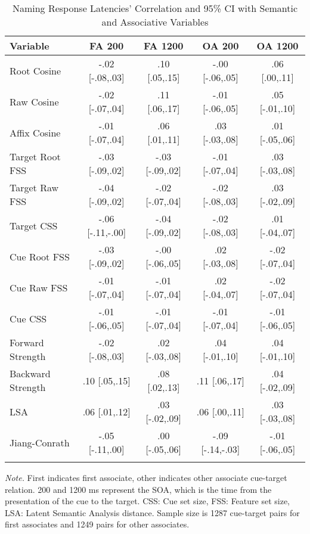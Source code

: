 \documentclass[english,,man]{apa6}
\theoremstyle{definition}
\theoremstyle{definition}
\theoremstyle{definition}
\theoremstyle{remark}
\begin{document}
\begin{table}[tbp]
\begin{center}
\begin{threeparttable}
\caption{\label{tab:name-table}Naming Response Latencies' Correlation and 95\% CI with Semantic and Associative Variables}
\small{
\begin{tabular}{lcccc}
\toprule
Variable & \multicolumn{1}{c}{FA 200} & \multicolumn{1}{c}{FA 1200} & \multicolumn{1}{c}{OA 200} & \multicolumn{1}{c}{OA 1200}\\
\midrule
Root Cosine & -.02 [-.08,.03] & .10 [.05,.15] & -.00 [-.06,.05] & .06 [.00,.11]\\
Raw Cosine & -.02 [-.07,.04] & .11 [.06,.17] & -.01 [-.06,.05] & .05 [-.01,.10]\\
Affix Cosine & -.01 [-.07,.04] & .06 [.01,.11] & .03 [-.03,.08] & .01 [-.05,.06]\\
Target Root FSS & -.03 [-.09,.02] & -.03 [-.09,.02] & -.01 [-.07,.04] & .03 [-.03,.08]\\
Target Raw FSS & -.04 [-.09,.02] & -.02 [-.07,.04] & -.02 [-.08,.03] & .03 [-.02,.09]\\
Target CSS & -.06 [-.11,-.00] & -.04 [-.09,.02] & -.02 [-.08,.03] & .01 [-.04,.07]\\
Cue Root FSS & -.03 [-.09,.02] & -.00 [-.06,.05] & .02 [-.03,.08] & -.02 [-.07,.04]\\
Cue Raw FSS & -.01 [-.07,.04] & -.01 [-.07,.04] & .02 [-.04,.07] & -.02 [-.07,.04]\\
Cue CSS & -.01 [-.06,.05] & -.01 [-.07,.04] & -.01 [-.07,.04] & -.01 [-.06,.05]\\
Forward Strength & -.02 [-.08,.03] & .02 [-.03,.08] & .04 [-.01,.10] & .04 [-.01,.10]\\
Backward Strength & .10 [.05,.15] & .08 [.02,.13] & .11 [.06,.17] & .04 [-.02,.09]\\
LSA & .06 [.01,.12] & .03 [-.02,.09] & .06 [.00,.11] & .03 [-.03,.08]\\
Jiang-Conrath & -.05 [-.11,.00] & .00 [-.05,.06] & -.09 [-.14,-.03] & -.01 [-.06,.05]\\
\bottomrule
\addlinespace
\end{tabular}
}
\begin{tablenotes}[para]
\normalsize{\textit{Note.} First indicates first associate, other indicates other associate cue-target relation. 200 and 1200 ms represent the SOA, which is the time from the presentation of the cue to the target. CSS: Cue set size, FSS: Feature set size, LSA: Latent Semantic Analysis distance. Sample size is 1287 cue-target pairs for first associates and 1249 pairs for other associates.}
\end{tablenotes}
\end{threeparttable}
\end{center}
\end{table}
\end{document}
